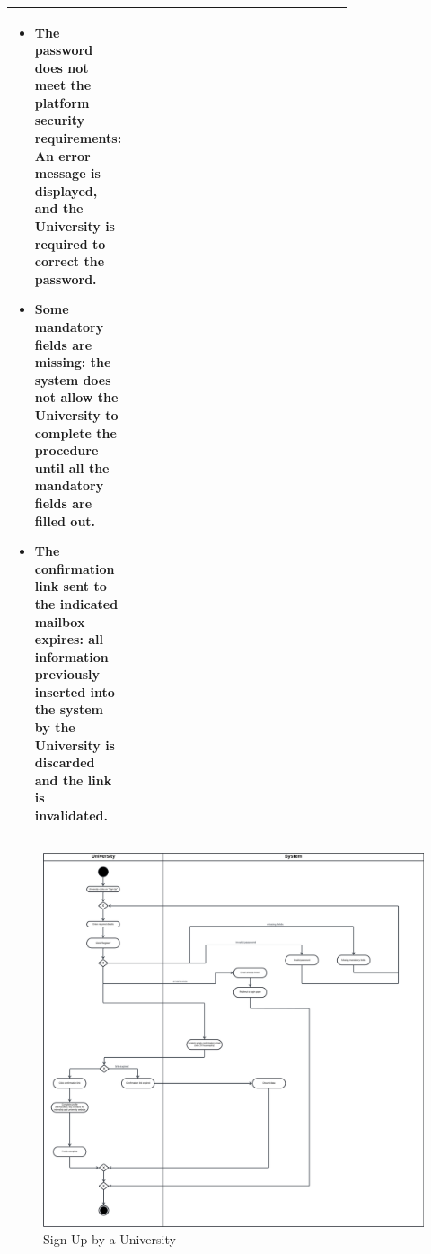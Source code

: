 \begin{center}
\begin{longtable}{|l|p{0.75\linewidth}|}
\begin{itemize}
            \item The password does not meet the platform security requirements: An error message is displayed, and the University is required to correct the password.
            \item Some mandatory fields are missing: the system does not allow the University to complete the procedure until all the mandatory fields are filled out.
            \item The confirmation link sent to the indicated mailbox expires: all information previously inserted into the system by the University is discarded and the link is invalidated.
        \end{itemize}\\
        \hline
    \end{longtable}
\end{center}

\begin{figure}[H]
    \begin{center}
         \includegraphics[width=1\linewidth]{LaTeXCode/images/activity diagram/UC3.png}
         \caption{Sign Up by a University}
         \label{fig:signup_university_ad}
     \end{center}
\end{figure}

\newpage

